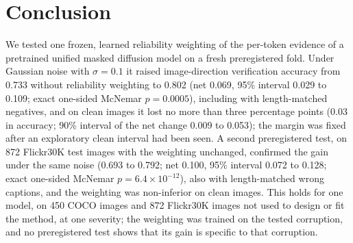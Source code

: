 
\section{Conclusion}\label{sec:conclusion}
We tested one frozen, learned reliability weighting of the per-token evidence of a pretrained unified masked diffusion model on a fresh
preregistered fold.
Under Gaussian noise with $\sigma=0.1$ it raised image-direction verification accuracy from 0.733 without reliability weighting to 0.802
(net 0.069, 95\% interval 0.029 to 0.109; exact one-sided McNemar $p=0.0005$), including with length-matched negatives, and on clean
images it lost no more than three percentage points (0.03 in accuracy; 90\% interval of the net change 0.009 to 0.053); the margin was
fixed after an exploratory clean interval had been seen.
A second preregistered test, on 872 Flickr30K test images with the weighting unchanged, confirmed the gain under the same noise (0.693 to
0.792; net 0.100, 95\% interval 0.072 to 0.128; exact one-sided McNemar $p=6.4\times10^{-12}$), also with length-matched wrong captions, and
the weighting was non-inferior on clean images.
This holds for one model, on 450 COCO images and 872 Flickr30K images not used to design or fit the method, at one severity; the weighting
was trained on the tested corruption, and no preregistered test shows that its gain is specific to that corruption.

